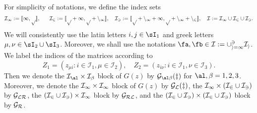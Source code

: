 For simplicity of notations, we define the index sets
$$\cal I_1:=\llbracket 1,p\rrbracket, \ \quad \ \cal I_2:=\llbracket p+1,p+n_1\rrbracket, \quad \cal I_3:=\llbracket p+n_1+1,p+n_1+n_2\rrbracket ,\quad \cal I:=\cal I_1\cup \cal I_2 \cup \cal I_3.$$
 We will consistently use the latin letters $i,j\in\sI_{1}$ and greek letters $\mu,\nu\in\sI_{2}\cup \sI_{3}$. Moreover, we shall use the notations $\fa,\fb\in \cal I:=\cup_{i=1}^3 \cal I_i$. We label the indices of the matrices according to
 $$Z_1= (z_{\mu i}:i\in \mathcal I_1, \mu \in \mathcal I_2), \quad Z_2= (z_{i\nu}:i\in \mathcal I_1, \nu \in \mathcal I_3).$$
Then we denote the $\cal I_\al \times \cal I_\beta$ block of $ G(z)$ by $ \cal G_{\al\beta}(z)$ for $\al,\beta=1,2,3$. Moreover,  we denote the $\cal I_1 \times \cal I_1$ block of $ G(z)$ by $ \cal G_{L}(z)$, the $\cal I_1 \times (\cal I_2 \cup \cal I_3)$ by $\cal G_{LR}$, the $ (\cal I_2 \cup \cal I_3)\times \cal I_1$ block by $\cal G_{RL}$, and the $ (\cal I_2 \cup \cal I_3)\times (\cal I_2 \cup \cal I_3)$ block by $\cal G_R$. 
